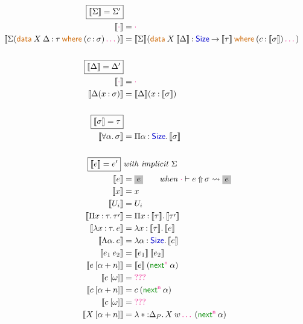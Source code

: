 \documentclass{article}
\newcommand{\meta}[1]{\mathsf{\textcolor{metacolour}{#1}}}
\newcommand{\ind}[1]{\mathsf{\textcolor{indcolour}{#1}}}
\newcommand{\constr}[1]{\mathsf{\textcolor{constrcolour}{#1}}}
\newcommand{\kw}[1]{\mathsf{\textcolor{kwcolour}{#1}}}
\newcommand{\target}[1]{\colorbox{lightgray}{$#1$}}
\newcommand{\kwopen}[1]{\kw{#1}\:}
\newcommand{\kwbin}[1]{\:\kw{#1}\:}
\newcommand{\pr}[1]{\raisebox{-#1pt}{$^\prime$}}
\newcommand{\taupr}{\tau\pr{2}}
\newcommand{\poly}[2]{\forall #1 \mathpunct{.} #2}
\newcommand{\fun}[3]{\Pi #1 \mathbin{:} #2 \mathpunct{.} #3}
\newcommand{\arr}[2]{#1 \mathbin{\rightarrow} #2}
\newcommand{\lam}[3]{\lambda #1 \mathbin{:} #2 \mathpunct{.} #3}
\newcommand{\Lam}[2]{\Lambda #1 \mathpunct{.} #2}
\newcommand{\app}[2]{#1 \: #2}
\newcommand{\App}[2]{#1 \: \mathopen{[} #2 \mathclose{]}}
\newcommand{\data}[3]{\kwopen{data} #1 \mathbin{:} #2 \kwbin{where} #3}
\newcommand{\annot}[2]{#1 \mathbin{:} #2}
\newcommand{\Size}{\ind{Size}}
\newcommand{\next}{\constr{next}}
\newcommand{\nil}{\meta{\cdot}}
\newcommand{\seq}{\,\meta{\dots}\,}
\newcommand{\compile}[1]{\mathopen{\llbracket} #1 \mathclose{\rrbracket}}
\newcommand{\compilesto}{\mathrel{\rightsquigarrow}}
\newcommand{\huh}{\meta{???}}
\renewcommand{\infer}[3]{#1 \vdash #2 \mathbin{\Uparrow} #3}
\begin{document}
\iffalse
\begin{figure}[h]
    \centering
    \begin{align*}
        \fbox{$\compile{\Sigma} = \Sigma'$} \hfill \\
        \compile{\nil} &= \nil \\
        \compile{\Sigma(\data{\app{X}{\Delta}}{\tau}{(\annot{c}{\sigma}) \seq})} &= \compile{\Sigma}(\data{\app{X}{\compile{\Delta}}}{\arr{\Size}{\compile{\tau}}}{(\annot{c}{\compile{\sigma}}) \seq}) \\
        \hfill \\
        \fbox{$\compile{\Delta} = \Delta'$} \hfill \\
        \compile{\nil} &= \nil \\
        \compile{\Delta(\annot{x}{\sigma})} &= \compile{\Delta}(\annot{x}{\compile{\sigma}}) \\
        \hfill \\
        \fbox{$\compile{\sigma} = \tau$} \hfill \\
        \compile{\poly{\alpha}{\sigma}} &= \fun{\alpha}{\Size}{\compile{\sigma}} \\
        \hfill \\
        \fbox{$\compile{e} = e'$} ~ &\textit{with implicit $\Sigma$} \hfill \\
        \compile{e} &= \target{e} \qquad \textit{when} ~ \infer{\nil}{e}{\sigma} \compilesto \target{e} \\
        \compile{x} &= x \\
        \compile{U_i} &= U_i \\
        \compile{\fun{x}{\tau}{\taupr}} &= \fun{x}{\compile{\tau}}{\compile{\taupr}} \\
        \compile{\lam{x}{\tau}{e}} &= \lam{x}{\compile{\tau}}{\compile{e}} \\
        \compile{\Lam{\alpha}{e}} &= \lam{\alpha}{\Size}{\compile{e}} \\
        \compile{\app{e_1}{e_2}} &= \app{\compile{e_1}}{\compile{e_2}} \\
        \compile{\App{e}{\alpha + n}} &= \app{\compile{e}}{(\app{\next^\meta{n}}{\alpha})} \\
        \compile{\App{e}{\omega}} &= \huh \\
        \compile{\App{c}{\alpha + n}} &= \app{c}{(\app{\next^\meta{n}}{\alpha})} \\
        \compile{\App{c}{\omega}} &= \huh \\
        \compile{\App{X}{\alpha + n}} &= \lam*{\Delta_P}{\app{\app{X}{w \seq}}{(\app{\next^\meta{n}}{\alpha})}} \\

\end{align*}
\end{figure}
\end{document}
